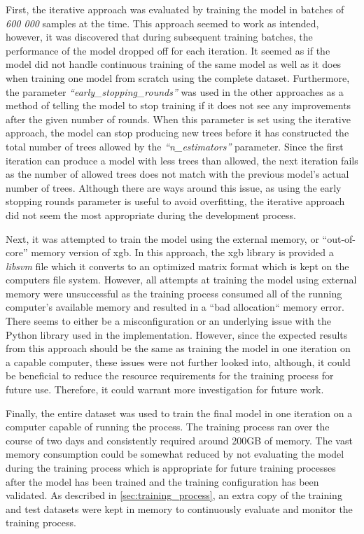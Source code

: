 First, the iterative approach was evaluated by training the model in batches of \textit{600 000} samples at the time. This approach seemed to work as intended, however, it was discovered that during subsequent training batches, the performance of the model dropped off for each iteration. It seemed as if the model did not handle continuous training of the same model as well as it does when training one model from scratch using the complete dataset. Furthermore, the parameter \textit{``early\_stopping\_rounds''} was used in the other approaches as a method of telling the model to stop training if it does not see any improvements after the given number of rounds. When this parameter is set using the iterative approach, the model can stop producing new trees before it has constructed the total number of trees allowed by the \textit{``n\_estimators''} parameter. Since the first iteration can produce a model with less trees than allowed, the next iteration fails as the number of allowed trees does not match with the previous model's actual number of trees. Although there are ways around this issue, as using the early stopping rounds parameter is useful to avoid overfitting, the iterative approach did not seem the most appropriate during the development process.

Next, it was attempted to train the model using the external memory, or ``out-of-core'' memory version of \acrshort{xgb}. In this approach, the \acrshort{xgb} library is provided a \textit{libsvm} file which it converts to an optimized matrix format which is kept on the computers file system. However, all attempts at training the model using external memory were unsuccessful as the training process consumed all of the running computer's available memory and resulted in a ``bad allocation`` memory error. There seems to either be a misconfiguration or an underlying issue with the Python library used in the implementation. However, since the expected results from this approach should be the same as training the model in one iteration on a capable computer, these issues were not further looked into, although, it could be beneficial to reduce the resource requirements for the training process for future use. Therefore, it could warrant more investigation for future work.

Finally, the entire dataset was used to train the final model in one iteration on a computer capable of running the process. The training process ran over the course of two days and consistently required around 200GB of memory. The vast memory consumption could be somewhat reduced by not evaluating the model during the training process which is appropriate for future training processes after the model has been trained and the training configuration has been validated. As described in \cref{sec:training_process}, an extra copy of the training and test datasets were kept in memory to continuously evaluate and monitor the training process.

